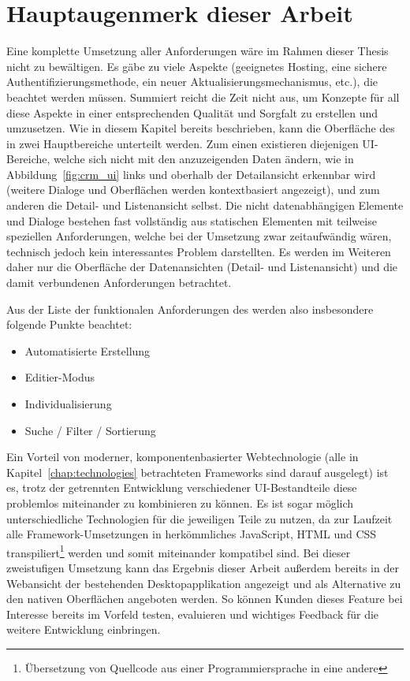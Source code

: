 \section{Hauptaugenmerk dieser Arbeit}
Eine komplette Umsetzung aller Anforderungen wäre im Rahmen dieser Thesis nicht zu bewältigen. Es gäbe zu viele Aspekte (geeignetes Hosting, eine sichere Authentifizierungsmethode, ein neuer Aktualisierungsmechanismus, etc.), die beachtet werden müssen. Summiert reicht die Zeit nicht aus, um Konzepte für all diese Aspekte in einer entsprechenden Qualität und Sorgfalt zu erstellen und umzusetzen. 
Wie in diesem Kapitel bereits beschrieben, kann die Oberfläche des  in zwei Hauptbereiche unterteilt werden. Zum einen existieren diejenigen UI-Bereiche, welche sich nicht mit den anzuzeigenden Daten ändern, wie in Abbildung~\ref{fig:crm_ui} links und oberhalb der Detailansicht erkennbar wird (weitere Dialoge und Oberflächen werden kontextbasiert angezeigt), und zum anderen die Detail- und Listenansicht selbst. Die nicht datenabhängigen Elemente und Dialoge bestehen fast vollständig aus statischen Elementen mit teilweise speziellen Anforderungen, welche bei der Umsetzung zwar zeitaufwändig wären, technisch jedoch kein interessantes Problem darstellten. Es werden im Weiteren daher nur die Oberfläche der Datenansichten (Detail- und Listenansicht) und die damit verbundenen Anforderungen betrachtet. 

Aus der Liste der funktionalen Anforderungen des  werden also insbesondere folgende Punkte beachtet:
\begin{itemize}
    \item{Automatisierte Erstellung}
    \item{Editier-Modus}
    \item{Individualisierung}
    \item{Suche / Filter / Sortierung}
\end{itemize}

Ein Vorteil von moderner, komponentenbasierter Webtechnologie (alle in Kapitel~\ref{chap:technologies} betrachteten Frameworks sind darauf ausgelegt) ist es, trotz der getrennten Entwicklung verschiedener UI-Bestandteile diese problemlos miteinander zu kombinieren zu können. Es ist sogar möglich unterschiedliche Technologien für die jeweiligen Teile zu nutzen, da zur Laufzeit alle Framework-Umsetzungen in herkömmliches JavaScript, HTML und CSS transpiliert\footnote{Übersetzung von Quellcode aus einer Programmiersprache in eine andere} werden und somit miteinander kompatibel sind.
Bei dieser zweistufigen Umsetzung kann das Ergebnis dieser Arbeit außerdem bereits in der Webansicht der bestehenden Desktopapplikation angezeigt und als Alternative zu den nativen Oberflächen angeboten werden. So können Kunden dieses Feature bei Interesse bereits im Vorfeld testen, evaluieren und wichtiges Feedback für die weitere Entwicklung einbringen.
